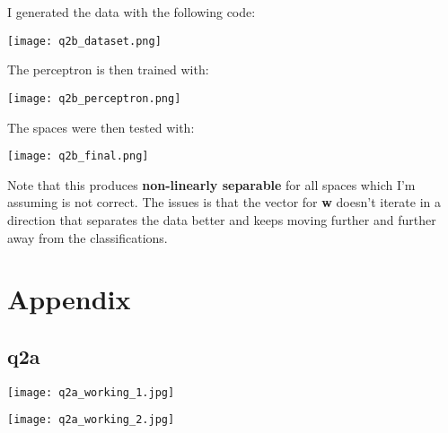 \documentclass{article}
\begin{document}
I generated the data with the following code:

\texttt{[image: q2b\_dataset.png]}

The perceptron is then trained with:

\texttt{[image: q2b\_perceptron.png]}

The spaces were then tested with:

\texttt{[image: q2b\_final.png]}

Note that this produces \textbf{non-linearly separable} for all spaces which I'm assuming is not correct.
The issues is that the vector for \textbf{w} doesn't iterate in a direction that separates the data 
better and keeps moving further and further away from the classifications.

\newpage
\section*{Appendix}

\subsection{q2a}
\label{working:2a}
\texttt{[image: q2a\_working\_1.jpg]}

\newpage
\texttt{[image: q2a\_working\_2.jpg]}
\end{document}
